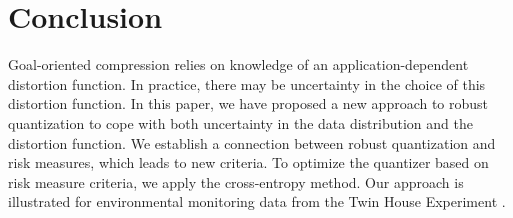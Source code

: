 \documentclass[journal]{IEEEtran}
\begin{document}
\section{Conclusion}

Goal-oriented compression relies on knowledge of an application-dependent distortion function. In practice, there may be uncertainty in the choice of this distortion function. In this paper, we have proposed a new approach to robust quantization to cope with both uncertainty in the data distribution and the distortion function. We establish a connection between robust quantization and risk measures, which leads to new criteria. To optimize the quantizer based on risk measure criteria, we apply the cross-entropy method. Our approach is illustrated for environmental monitoring data from the Twin House Experiment \cite{Kersken2020}.




\end{document}
